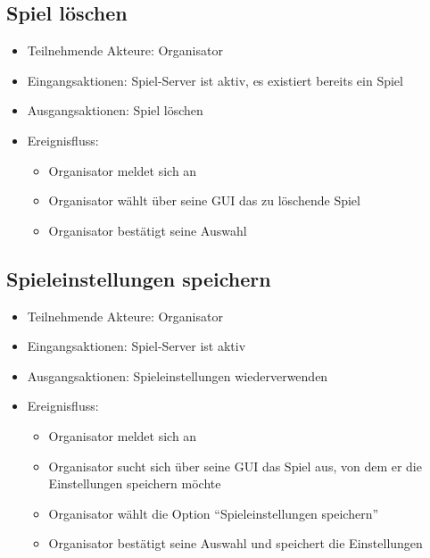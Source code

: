 \documentclass[a4paper]{scrreprt}
\begin{document}
    \subsection{Spiel löschen}
    \begin{itemize}
        \item Teilnehmende Akteure: \Gls{Organisator}
        \item Eingangsaktionen: \Gls{Spiel-Server} ist aktiv, es existiert bereits ein Spiel
        \item Ausgangsaktionen: \Gls{Spiel} löschen
        \item Ereignisfluss:
        \begin{itemize}
            \item \Gls{Organisator} meldet sich an
            \item \Gls{Organisator} wählt über seine GUI das zu löschende Spiel
            \item \Gls{Organisator} bestätigt seine Auswahl
        \end{itemize}
    \end{itemize}

    \subsection{Spieleinstellungen speichern}
    \begin{itemize}
        \item Teilnehmende Akteure: \Gls{Organisator}
        \item Eingangsaktionen: \Gls{Spiel-Server} ist aktiv
        \item Ausgangsaktionen: \Gls{Spieleinstellungen} wiederverwenden
        \item Ereignisfluss:
        \begin{itemize}
            \item \Gls{Organisator} meldet sich an
            \item \Gls{Organisator} sucht sich über seine GUI das \Gls{Spiel} aus, von dem er die Einstellungen speichern möchte
            \item \Gls{Organisator} wählt die Option \enquote{Spieleinstellungen speichern}
            \item \Gls{Organisator} bestätigt seine Auswahl und speichert die Einstellungen
        \end{itemize}
    \end{itemize}
\end{document}
